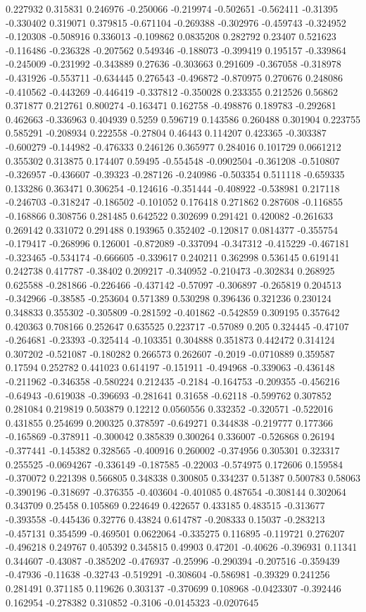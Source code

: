 0.227932 0.315831 0.246976 -0.250066 -0.219974 -0.502651 -0.562411 -0.31395 -0.330402 0.319071 0.379815 -0.671104 -0.269388 -0.302976 -0.459743 -0.324952 -0.120308 -0.508916 0.336013 -0.109862 0.0835208 0.282792 0.23407 0.521623 -0.116486 -0.236328 -0.207562 0.549346 -0.188073 -0.399419 0.195157 -0.339864 -0.245009 -0.231992 -0.343889 0.27636 -0.303663 0.291609 -0.367058 -0.318978 -0.431926 -0.553711 -0.634445 0.276543 -0.496872 -0.870975 0.270676 0.248086 -0.410562 -0.443269 -0.446419 -0.337812 -0.350028 0.233355 0.212526 0.56862 0.371877 0.212761 0.800274 -0.163471 0.162758 -0.498876 0.189783 -0.292681 0.462663 -0.336963 0.404939 0.5259 0.596719 0.143586 0.260488 0.301904 0.223755 0.585291 -0.208934 0.222558 -0.27804 0.46443 0.114207 0.423365 -0.303387 -0.600279 -0.144982 -0.476333 0.246126 0.365977 0.284016 0.101729 0.0661212 0.355302 0.313875 0.174407 0.59495 -0.554548 -0.0902504 -0.361208 -0.510807 -0.326957 -0.436607 -0.39323 -0.287126 -0.240986 -0.503354 0.511118 -0.659335 0.133286 0.363471 0.306254 -0.124616 -0.351444 -0.408922 -0.538981 0.217118 -0.246703 -0.318247 -0.186502 -0.101052 0.176418 0.271862 0.287608 -0.116855 -0.168866 0.308756 0.281485 0.642522 0.302699 0.291421 0.420082 -0.261633 0.269142 0.331072 0.291488 0.193965 0.352402 -0.120817 0.0814377 -0.355754 -0.179417 -0.268996 0.126001 -0.872089 -0.337094 -0.347312 -0.415229 -0.467181 -0.323465 -0.534174 -0.666605 -0.339617 0.240211 0.362998 0.536145 0.619141 0.242738 0.417787 -0.38402 0.209217 -0.340952 -0.210473 -0.302834 0.268925 0.625588 -0.281866 -0.226466 -0.437142 -0.57097 -0.306897 -0.265819 0.204513 -0.342966 -0.38585 -0.253604 0.571389 0.530298 0.396436 0.321236 0.230124 0.348833 0.355302 -0.305809 -0.281592 -0.401862 -0.542859 0.309195 0.357642 0.420363 0.708166 0.252647 0.635525 0.223717 -0.57089 0.205 0.324445 -0.47107 -0.264681 -0.23393 -0.325414 -0.103351 0.304888 0.351873 0.442472 0.314124 0.307202 -0.521087 -0.180282 0.266573 0.262607 -0.2019 -0.0710889 0.359587 0.17594 0.252782 0.441023 0.614197 -0.151911 -0.494968 -0.339063 -0.436148 -0.211962 -0.346358 -0.580224 0.212435 -0.2184 -0.164753 -0.209355 -0.456216 -0.64943 -0.619038 -0.396693 -0.281641 0.31658 -0.62118 -0.599762 0.307852 0.281084 0.219819 0.503879 0.12212 0.0560556 0.332352 -0.320571 -0.522016 0.431855 0.254699 0.200325 0.378597 -0.649271 0.344838 -0.219777 0.177366 -0.165869 -0.378911 -0.300042 0.385839 0.300264 0.336007 -0.526868 0.26194 -0.377441 -0.145382 0.328565 -0.400916 0.260002 -0.374956 0.305301 0.323317 0.255525 -0.0694267 -0.336149 -0.187585 -0.22003 -0.574975 0.172606 0.159584 -0.370072 0.221398 0.566805 0.348338 0.300805 0.334237 0.51387 0.500783 0.58063 -0.390196 -0.318697 -0.376355 -0.403604 -0.401085 0.487654 -0.308144 0.302064 0.343709 0.25458 0.105869 0.224649 0.422657 0.433185 0.483515 -0.313677 -0.393558 -0.445436 0.32776 0.43824 0.614787 -0.208333 0.15037 -0.283213 -0.457131 0.354599 -0.469501 0.0622064 -0.335275 0.116895 -0.119721 0.276207 -0.496218 0.249767 0.405392 0.345815 0.49903 0.47201 -0.40626 -0.396931 0.11341 0.344607 -0.43087 -0.385202 -0.476937 -0.25996 -0.290394 -0.207516 -0.359439 -0.47936 -0.11638 -0.32743 -0.519291 -0.308604 -0.586981 -0.39329 0.241256 0.281491 0.371185 0.119626 0.303137 -0.370699 0.108968 -0.0423307 -0.392446 0.162954 -0.278382 0.310852 -0.3106 -0.0145323 -0.0207645 
